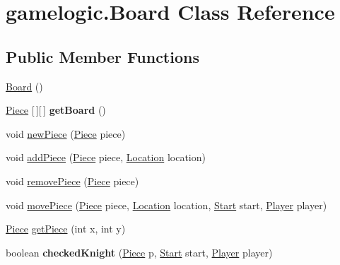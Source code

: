 \hypertarget{classgamelogic_1_1_board}{}\section{gamelogic.\+Board Class Reference}
\label{classgamelogic_1_1_board}
\subsection*{Public Member Functions}
\begin{DoxyCompactItemize}
\item 
\mbox{\hyperlink{classgamelogic_1_1_board_a00654e3d421a89e0532462dc48d85a25}{Board}} ()
\item 
\mbox{\label{classgamelogic_1_1_board_a3db0438a1ed6c0bbfd5c35403a4a8a88}} 
\mbox{\hyperlink{classgamelogic_1_1_piece}{Piece}} \mbox{[}$\,$\mbox{]}\mbox{[}$\,$\mbox{]} {\bfseries get\+Board} ()
\item 
void \mbox{\hyperlink{classgamelogic_1_1_board_a8173f158887a169056c7b1e39cc1885d}{new\+Piece}} (\mbox{\hyperlink{classgamelogic_1_1_piece}{Piece}} piece)
\item 
void \mbox{\hyperlink{classgamelogic_1_1_board_acc3de86741f4e9cec9b31c544937333d}{add\+Piece}} (\mbox{\hyperlink{classgamelogic_1_1_piece}{Piece}} piece, \mbox{\hyperlink{classgamelogic_1_1_location}{Location}} location)
\item 
void \mbox{\hyperlink{classgamelogic_1_1_board_ad538e51550a585d1465d76d92f3ddd10}{remove\+Piece}} (\mbox{\hyperlink{classgamelogic_1_1_piece}{Piece}} piece)
\item 
void \mbox{\hyperlink{classgamelogic_1_1_board_ab7bfac3d534d441e6ebbd1adef05659b}{move\+Piece}} (\mbox{\hyperlink{classgamelogic_1_1_piece}{Piece}} piece, \mbox{\hyperlink{classgamelogic_1_1_location}{Location}} location, \mbox{\hyperlink{classgamelogic_1_1_start}{Start}} start, \mbox{\hyperlink{classgamelogic_1_1_player}{Player}} player)
\item 
\mbox{\hyperlink{classgamelogic_1_1_piece}{Piece}} \mbox{\hyperlink{classgamelogic_1_1_board_ab53a8d50f60e7127e633fd4843e8c20c}{get\+Piece}} (int x, int y)
\item 
\mbox{\label{classgamelogic_1_1_board_abc340155b9d2bdb65596446782461e23}} 
boolean {\bfseries checked\+Knight} (\mbox{\hyperlink{classgamelogic_1_1_piece}{Piece}} p, \mbox{\hyperlink{classgamelogic_1_1_start}{Start}} start, \mbox{\hyperlink{classgamelogic_1_1_player}{Player}} player)

\end{DoxyCompactItemize}
